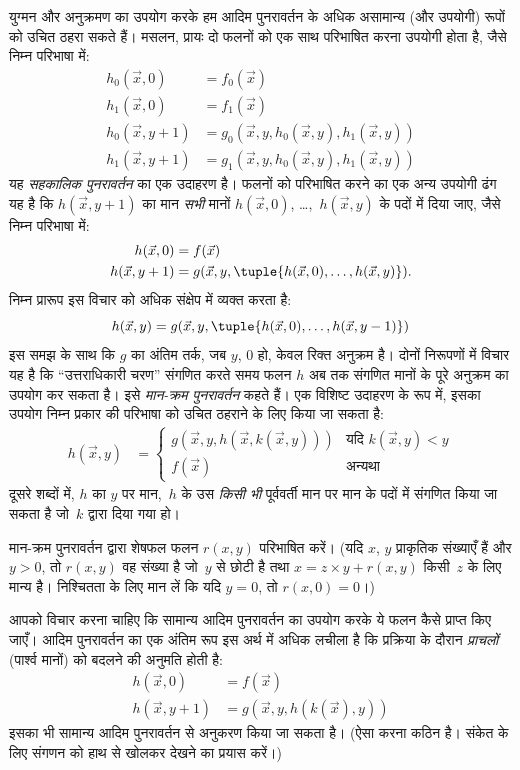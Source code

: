\documentclass[../../../include/open-logic-section]{subfiles}
\begin{document}

युग्मन और अनुक्रमण का उपयोग करके हम आदिम पुनरावर्तन के अधिक असामान्य
(और उपयोगी) रूपों को उचित ठहरा सकते हैं। मसलन, प्रायः दो फलनों को एक साथ
परिभाषित करना उपयोगी होता है, जैसे निम्न परिभाषा में:
\begin{align*}
h_0(\vec x, 0) & = f_0(\vec x) \\
h_1(\vec x, 0) & = f_1(\vec x) \\
h_0(\vec x, y+1) & = g_0(\vec x, y, h_0(\vec x, y), h_1(\vec x, y)) \\
h_1(\vec x, y+1) & = g_1(\vec x, y, h_0(\vec x, y), h_1(\vec x, y))
\end{align*}
यह \emph{सहकालिक पुनरावर्तन} का एक उदाहरण है। फलनों को परिभाषित करने का
एक अन्य उपयोगी ढंग यह है कि $h(\vec x, y+1)$ का मान \emph{सभी} मानों
$h(\vec x, 0)$, \dots,~$h(\vec x, y)$ के पदों में दिया जाए, जैसे निम्न
परिभाषा में:
\begin{align*}
h(\vec x, 0) & = f(\vec x) \\
h(\vec x, y+1) & = g(\vec x, y, \tuple{h(\vec x, 0), \dots, h(\vec x, y)}).
\end{align*}
निम्न प्रारूप इस विचार को अधिक संक्षेप में व्यक्त करता है:
\[
h(\vec x, y) = g(\vec x, y, \tuple{h(\vec x, 0), \dots, h(\vec x, y-1)})
\]
इस समझ के साथ कि $g$ का अंतिम तर्क, जब $y$, $0$ हो, केवल रिक्त अनुक्रम
है। दोनों निरूपणों में विचार यह है कि ``उत्तराधिकारी चरण'' संगणित करते
समय फलन $h$ अब तक संगणित मानों के पूरे अनुक्रम का उपयोग कर सकता है। इसे
\emph{मान-क्रम पुनरावर्तन} कहते हैं। एक विशिष्ट उदाहरण के रूप में, इसका
उपयोग निम्न प्रकार की परिभाषा को उचित ठहराने के लिए किया जा सकता है:
\begin{align*}
h(\vec x, y) & = \begin{cases}
  g(\vec x, y, h(\vec x, k(\vec x, y))) & \text{यदि $k(\vec x, y) < y$} \\
  f(\vec x) & \text{अन्यथा}
\end{cases}
\end{align*}
दूसरे शब्दों में, $h$ का $y$ पर मान,~$h$ के उस \emph{किसी भी}
पूर्ववर्ती मान पर मान के पदों में संगणित किया जा सकता है जो~$k$ द्वारा दिया गया हो।


\begin{prob}
  मान-क्रम पुनरावर्तन द्वारा शेषफल फलन $r(x,y)$ परिभाषित करें। (यदि
  $x$, $y$ प्राकृतिक संख्याएँ हैं और $y > 0$, तो $r(x,y)$ वह संख्या
  है जो~$y$ से छोटी है तथा $x = z\times y + r(x,y)$ किसी~$z$ के लिए
  मान्य है। निश्चितता के लिए मान लें कि यदि $y=0$, तो $r(x,0) = 0$।)
\end{prob}

आपको विचार करना चाहिए कि सामान्य आदिम पुनरावर्तन का उपयोग करके ये फलन
कैसे प्राप्त किए जाएँ। आदिम पुनरावर्तन का एक अंतिम रूप इस अर्थ में अधिक
लचीला है कि प्रक्रिया के दौरान \emph{प्राचलों} (पार्श्व मानों) को बदलने
की अनुमति होती है:
\begin{align*}
h(\vec x, 0) & = f(\vec x) \\
h(\vec x, y+1) & = g(\vec x, y, h(k(\vec x), y))
\end{align*}
इसका भी सामान्य आदिम पुनरावर्तन से अनुकरण किया जा सकता है। (ऐसा करना
कठिन है। संकेत के लिए संगणन को हाथ से खोलकर देखने का प्रयास करें।)
\end{document}

